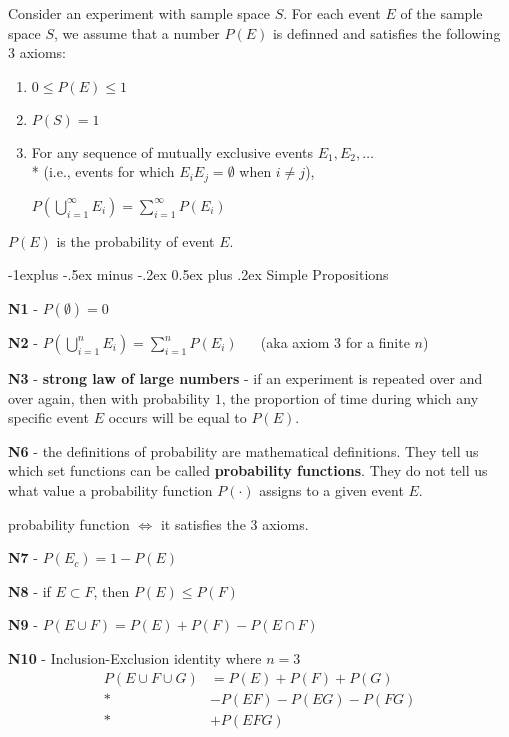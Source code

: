 \documentclass[10pt, landscape]{article}
\makeatletter
\renewcommand{\subsection}{\@startsection{subsection}{2}{0mm}%
  {-1explus -.5ex minus -.2ex}%
  {0.5ex plus .2ex}%
{\normalfont\normalsize\bfseries}}
\makeatother
\begin{document}
\begin{multicols*}{3}
  Consider an experiment with sample space $S$. 
  For each event $E$ of the sample space $S$, we assume that a number $P(E)$ is definned and satisfies the following 3 axioms:
  \begin{enumerate}
    \item $0 \leq P(E) \leq 1$ 
    \item $P(S) = 1$
    \item For any sequence of mutually exclusive events $E_1, E_2, \dots$ 
      \\* (i.e., events for which $E_iE_j = \emptyset$ when  $i \neq j$),
      \begin{tightcenter}
        $P(\bigcup\limits^\infty_{i=1} E_i) = \sum\limits^\infty_{i=1} P(E_i)$ 
      \end{tightcenter}
  \end{enumerate}
  $P(E)$ is the probability of event $E$.

  \subsection{Simple Propositions}

  \textbf{N1} - $P(\emptyset) = 0$

  \textbf{N2} - $P(\bigcup\limits^n_{i=1} E_i) = \sum\limits^n_{i=1} P(E_i)$ 
  $\quad$ (aka axiom 3 for a finite $n$)

  \textbf{N3} - \textbf{strong law of large numbers} - if an experiment is repeated over and over again, then with probability $1$, 
  the proportion of time during which any specific event $E$ occurs will be equal to $P(E)$.

  \textbf{N6} - the definitions of probability are mathematical definitions. 
  They tell us which set functions can be called \textbf{probability functions}. 
  They do not tell us what value a probability function $P(\cdot)$ assigns to a given event $E$.

  \begin{tightcenter}
    probability function $\iff$ it satisfies the 3 axioms.
  \end{tightcenter}

  \textbf{N7} - $P(E_c) = 1-P(E)$

  \textbf{N8} - if $E \subset F$, then $P(E) \leq P(F)$

  \textbf{N9} - $P(E \cup F) = P(E) + P(F) - P(E \cap F)$

  \textbf{N10} - Inclusion-Exclusion identity where $n=3$
  \begin{align*}
    P(E \cup F \cup G) &= P(E) + P(F) + P(G) \\*
                       &- P(EF) - P(EG) - P(FG) \\*
                       &+ P(EFG)
  \end{align*}


\end{multicols*}
\end{document}
